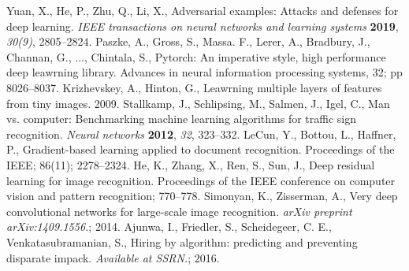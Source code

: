 \documentclass[journal,article,submit,moreauthors,pdftex]{Definitions/mdpi}
\begin{document}
\begin{thebibliography}{999}
Yuan, X., He, P., Zhu, Q., Li, X., Adversarial examples: Attacks and defenses for deep learning. {\em IEEE transactions on neural networks and learning systems} {\bf 2019}, {\em 30(9)}, 2805--2824.
Paszke, A., Gross, S., Massa. F., Lerer, A., Bradbury, J., Channan, G., ..., Chintala, S., Pytorch: An imperative style, high performance deep leawrning library. Advances in neural information processing systems, 32; pp 8026--8037.
Krizhevskey, A., Hinton, G., Leawrning multiple layers of features from tiny images. 2009.
Stallkamp, J., Schlipsing, M., Salmen, J., Igel, C., Man vs. computer: Benchmarking machine learning algorithms for traffic sign recognition. {\em Neural networks} {\bf 2012}, {\em 32}, 323--332.
LeCun, Y., Bottou, L., Haffner, P., Gradient-based learning applied to document recognition. Proceedings of the IEEE; 86(11); 2278--2324.
He, K., Zhang, X., Ren, S., Sun, J., Deep residual learning for image recognition. Proceedings of the IEEE conference on computer vision and pattern recognition; 770--778.
Simonyan, K., Zisserman, A., Very deep convolutional networks for large-scale image recognition. \textit{arXiv preprint arXiv:1409.1556.}; 2014.
Ajunwa, I., Friedler, S., Scheidegeer, C. E., Venkatasubramanian, S., Hiring by algorithm: predicting and preventing disparate impack. \textit{Available at SSRN.}; 2016.
\end{thebibliography}
\end{document}
